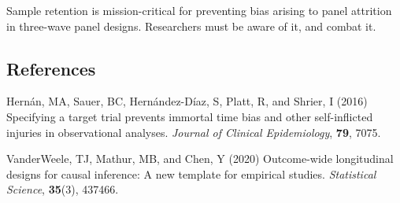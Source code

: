\documentclass[
  singlecolumn,
  9pt]{article}
\newlength{\cslentryspacing}
\begin{document}
Sample retention is mission-critical for preventing bias arising to
panel attrition in three-wave panel designs. Researchers must be aware
of it, and combat it.

\subsection*{References}\label{references}

\label{refs}
\setlength{\cslentryspacing}{0em}
\begin{CSLReferences}
Hernán, MA, Sauer, BC, Hernández-Díaz, S, Platt, R, and Shrier, I (2016)
Specifying a target trial prevents immortal time bias and other
self-inflicted injuries in observational analyses. \emph{Journal of
Clinical Epidemiology}, \textbf{79}, 7075.

VanderWeele, TJ, Mathur, MB, and Chen, Y (2020) Outcome-wide
longitudinal designs for causal inference: A new template for empirical
studies. \emph{Statistical Science}, \textbf{35}(3), 437466.

\end{CSLReferences}
\end{document}
